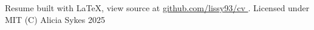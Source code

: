 \documentclass[]{resume-format}
\begin{document}
\vspace{10mm}
\begin{flushleft}
    \tiny\color{lightgray}
    Resume built with LaTeX, view source at
    \href{https://github.com/lissy93/cv}{ github.com/lissy93/cv }.
    Licensed under MIT (C) Alicia Sykes 2025
\end{flushleft}
\ 
\end{document}
